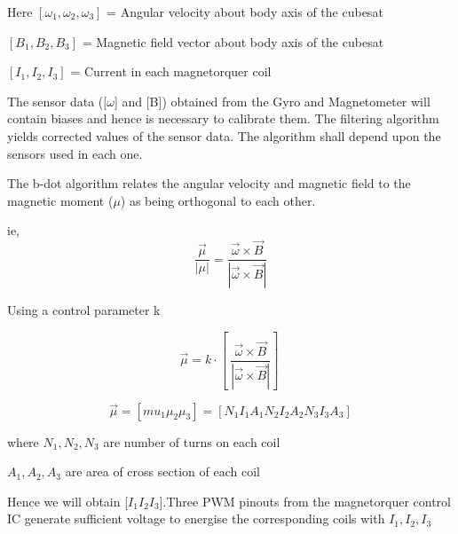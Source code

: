  \vspace{25pt}
 
Here $[\omega_1, \omega_2, \omega_3]$ = Angular velocity about body axis of the cubesat

\hspace{25pt}$[B_1,B_2,B_3]$ = Magnetic field vector about body axis of the cubesat

\hspace{25pt}$[I_1,I_2,I_3]$ = Current in each magnetorquer coil

\vspace{15pt}

The sensor data ([$\omega$] and [B]) obtained from the Gyro and Magnetometer will contain biases and hence is necessary to calibrate them. The filtering algorithm yields corrected values of the sensor data. The algorithm shall depend upon the sensors used in each one. 

\vspace{15pt}

The b-dot algorithm relates the angular velocity and magnetic field to the magnetic moment ($\mu$) as being orthogonal to each other.

ie,$$\frac{\vec{\mu}}{|\mu|} = \frac{\vec{\omega}\times\vec{B}}{|\vec{\omega}\times\vec{B}|}$$

\vspace{1cm}
\hspace{45pt}Using a control parameter k
\vspace{1cm}

$$\vec{\mu} = k\cdot [\ \frac{\vec{\omega}\times\vec{B}}{|\vec{\omega}\times\vec{B}|} ]\ $$

$$\vec{\mu}= [mu_1 \mu_2 \mu_3] = [N_1I_1A_1  N_2I_2A_2  N_3I_3A_3]$$

where $N_1,N_2,N_3$ are number of turns on each coil

\hspace{32pt}$A_1,A_2,A_3$ are area of cross section of each coil

\vspace{15pt}
Hence we will obtain [$I_1 I_2 I_3$].Three PWM pinouts from the magnetorquer control IC generate sufficient voltage to energise the corresponding coils with $I_1 ,I_2, I_3$

